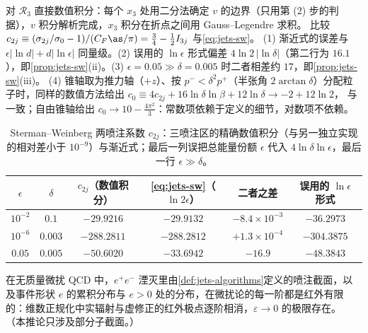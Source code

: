 \begin{example}\label{ex:jets-sw}
对 $\mathcal R_3$ 直接数值积分：每个 $x_3$ 处用二分法确定 $v$ 的边界（只用第 (2) 步的判据），$v$ 积分解析完成，$x_3$ 积分在折点之间用 Gauss--Legendre 求积。
比较 $c_{2j}\equiv(\sigma_{2j}/\sigma_0-1)/(C_F\as/\pi)=\frac34-\frac12I_{3j}$ 与\cref{eq:jets-sw}。
(1) 渐近式的误差与 $\epsilon|\ln d|+d|\ln\epsilon|$ 同量级。(2) 误用的 $\ln\epsilon$ 形式偏差 $4\ln2\,|\ln\delta|$（第二行为 $16.1$），即\cref{prop:jets-sw}(ii)。(3) $\epsilon=0.05\gg\delta=0.005$ 时二者相差约 $17$，即\cref{prop:jets-sw}(iii)。
(4) 锥轴取为推力轴（$+z$）、按 $p^-<\delta^2p^+$（半张角 $2\arctan\delta$）分配粒子时，同样的数值方法给出 $c_0\equiv4c_{2j}+16\ln\delta\ln\beta+12\ln\delta\to-2+12\ln2$，
与\cite{Becher:2015hka}一致；自由锥轴给出 $c_0\to10-\frac{4\pi^2}{3}$：常数项依赖于定义的细节，对数项不依赖。
\end{example}

\begin{table}[htbp]
\centering
\small
\renewcommand{\arraystretch}{1.0}
\begin{tabular}{@{}cccccc@{}}
\toprule
$\epsilon$ & $\delta$ & $c_{2j}$（数值积分） & \cref{eq:jets-sw}（$\ln2\epsilon$） & 二者之差 & 误用的 $\ln\epsilon$ 形式 \\
\midrule
$10^{-2}$ & $0.1$   & $-29.9216$  & $-29.9132$  & $-8.4\times10^{-3}$ & $-36.2973$ \\
$10^{-6}$ & $0.003$ & $-288.2811$ & $-288.2812$ & $+1.3\times10^{-4}$ & $-304.3875$ \\
\midrule
$0.05$    & $0.005$ & $-50.6020$  & $-33.6942$  & $-16.9$             & $-48.3843$ \\
\bottomrule
\end{tabular}
\caption{Sterman--Weinberg 两喷注系数 $c_{2j}$：三喷注区的精确数值积分（与另一独立实现的相对差小于 $10^{-9}$）与渐近式；最后一列误把总能量份额 $\epsilon$ 代入 $4\ln\delta\ln\epsilon$，最后一行 $\epsilon\gg\delta$。}
\label{tab:jets-sw-numerics}
\end{table}

\begin{corollary}\label{cor:jets-ir-finite}
在无质量微扰 QCD 中，$e^+e^-$ 湮灭里由\cref{def:jets-algorithms}定义的喷注截面，以及事件形状 $e$ 的累积分布与 $e>0$ 处的分布，在微扰论的每一阶都是红外有限的：维数正规化中实辐射与虚修正的红外极点逐阶相消，$\varepsilon\to0$ 的极限存在。
（本推论只涉及部分子截面。）
\end{corollary}

